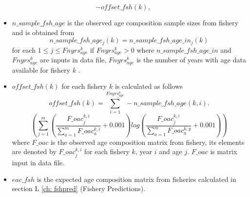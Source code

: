 \documentclass{article}
\begin{document}
\begin{equation*}
    -offset\_fsh(k),
\end{equation*}

\begin{itemize}
    \item $n\_sample\_fsh\_age$ is the observed age composition sample sizes from fishery
 and is obtained from $$n\_sample\_fsh\_age_j(k) = n\_sample\_fsh\_age\_in_j(k)$$ for each $1\leq j \leq Fnyrs^k_{age}$ if $Fnyrs^k_{age}>0$ 
 where $n\_sample\_fsh\_age\_in$ and $Fnyrs^k_{age}$ are inputs  %
 in data file,   %
  $Fnyrs^k_{age}$ is the number of years with age data available for fishery $k$
 .
\item $offset\_fsh(k)$ for each fishery $k$ is calculated as follows
\begin{equation*}
    offset\_fsh(k)=\displaystyle\sum_{i=1}^{Fnyrs^k_{age}}-n\_sample\_fsh\_age(k,i).
\end{equation*}
\begin{equation*}
   \left(\sum_{j=1}^m\left(\dfrac{F\_oac^{k,i}_j}{\sum_{a=1}^m F\_oac^{k,i}_a}+0.001\right)log\left(\dfrac{F\_oac^{k,i}_j}{\sum_{a=1}^m F\_oac^{k,y}_a}+0.001\right)\right)
\end{equation*}
where $F\_oac$ is the observed age composition matrix from fishery, %
 its elements are denoted by $F\_oac^{k,i}_j$
for each fishery $k$, year $i$ and age $j$. %
$F\_oac$ is matrix input in data file.
\item $eac\_fsh$ is the expected age composition matrix from fisheries calculated in section L \ref{ch: fshpred} (Fishery Predictions).
\end{itemize}
\end{document}
